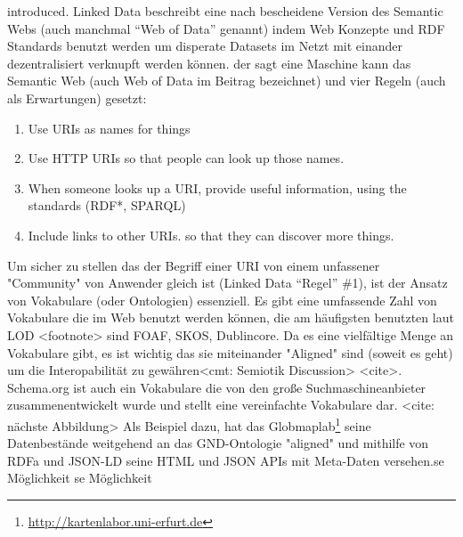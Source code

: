introduced. Linked Data beschreibt eine nach \citeauthor[S.~61]{dewilde2015information} bescheidene Version des Semantic Webs (auch manchmal \hyphenquote{german}{Web of Data} genannt) indem Web Konzepte und RDF Standards benutzt werden um disperate Datasets im Netzt mit einander dezentralisiert verknupft werden können.  der sagt eine Maschine kann das Semantic Web (auch Web of Data im Beitrag bezeichnet) und vier Regeln (auch als Erwartungen) gesetzt: 

\begin{enumerate}
	\item Use URIs as names for things
	\item Use HTTP URIs so that people can look up those names.
	\item When someone looks up a URI, provide useful information, using the standards (RDF*, SPARQL)
	\item Include links to other URIs. so that they can discover more things.
\end{enumerate}

Um sicher zu stellen das der Begriff einer URI von einem unfassener "Community" von Anwender gleich ist (Linked Data \hyphenquote{german}{Regel} \#1), ist der Ansatz von Vokabulare (oder Ontologien) essenziell. Es gibt eine umfassende Zahl von Vokabulare die im Web benutzt werden können, die am häufigsten benutzten laut LOD <footnote> sind FOAF, SKOS, Dublincore. Da es eine vielfältige Menge an Vokabulare gibt, es ist wichtig das sie miteinander "Aligned" sind (soweit es geht) um die Interopabilität zu gewähren<cmt: Semiotik Discussion> <cite>. Schema.org ist auch ein Vokabulare die von den große Suchmaschineanbieter zusammenentwickelt wurde und stellt eine vereinfachte Vokabulare dar. <cite: nächste Abbildung> Als Beispiel dazu, hat das Globmaplab\footnote{\url{http://kartenlabor.uni-erfurt.de}} seine Datenbestände weitgehend an das GND-Ontologie "aligned" und mithilfe von RDFa und JSON-LD seine HTML und JSON APIs mit Meta-Daten versehen.se Möglichkeit 
se Möglichkeit 




